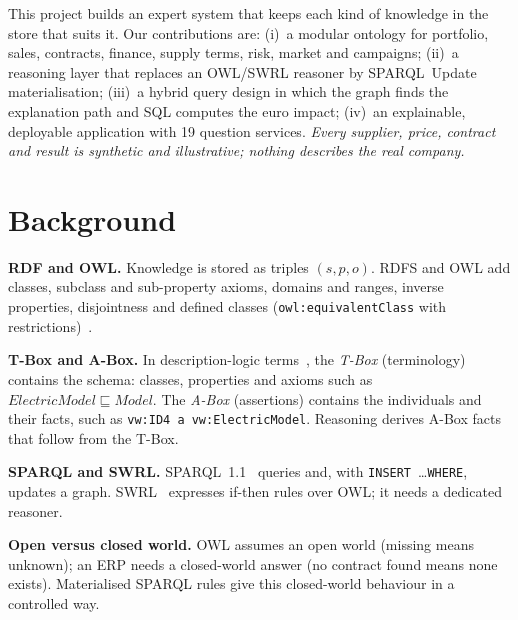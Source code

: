 \documentclass[conference]{IEEEtran}
\begin{document}
This project builds an expert system that keeps each kind of knowledge in the store that suits it.
Our contributions are:
(i)~a modular ontology for portfolio, sales, contracts, finance, supply terms, risk, market and campaigns;
(ii)~a reasoning layer that replaces an OWL/SWRL reasoner by SPARQL~Update materialisation;
(iii)~a hybrid query design in which the graph finds the explanation path and SQL computes the euro impact;
(iv)~an explainable, deployable application with 19 question services.
\emph{Every supplier, price, contract and result is synthetic and illustrative; nothing describes the real company.}

\section{Background}
\textbf{RDF and OWL.} Knowledge is stored as triples $(s,p,o)$. RDFS and OWL add classes, subclass and sub-property axioms, domains and ranges, inverse properties, disjointness and defined classes (\texttt{owl:equivalentClass} with restrictions)~\cite{owl2,rdf}.

\textbf{T-Box and A-Box.} In description-logic terms~\cite{dlhandbook}, the \emph{T-Box} (terminology) contains the schema: classes, properties and axioms such as $\mathit{ElectricModel}\sqsubseteq\mathit{Model}$. The \emph{A-Box} (assertions) contains the individuals and their facts, such as \texttt{vw:ID4 a vw:ElectricModel}. Reasoning derives A-Box facts that follow from the T-Box.

\textbf{SPARQL and SWRL.} SPARQL~1.1~\cite{sparql} queries and, with \texttt{INSERT}~\ldots\texttt{WHERE}, updates a graph. SWRL~\cite{swrl} expresses if-then rules over OWL; it needs a dedicated reasoner.

\textbf{Open versus closed world.} OWL assumes an open world (missing means unknown); an ERP needs a closed-world answer (no contract found means none exists). Materialised SPARQL rules give this closed-world behaviour in a controlled way.

\end{document}
